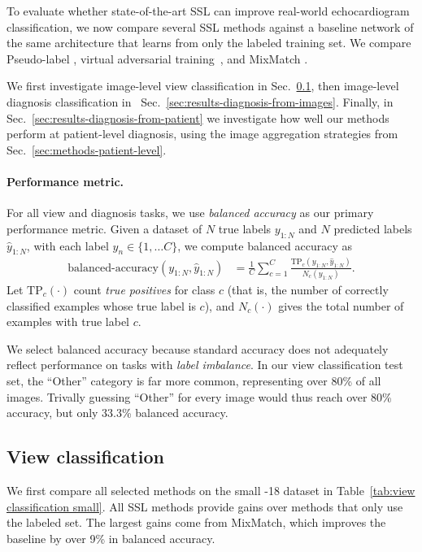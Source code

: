 To evaluate whether state-of-the-art SSL can improve real-world echocardiogram classification, we now compare several SSL methods against a baseline network of the same architecture that learns from only the labeled training set.
We compare Pseudo-label \citep{leePseudolabelSimpleEfficient2013}, virtual adversarial training~\citep{miyatoVirtualAdversarialTraining2019}, and MixMatch \citep{berthelotMixmatchHolisticApproach2019}. 

We first investigate image-level view classification in Sec.~\ref{sec:results-view}, then image-level diagnosis classification in ~Sec.~\ref{sec:results-diagnosis-from-images}.
Finally, in Sec.~\ref{sec:results-diagnosis-from-patient} we investigate how well our methods perform at patient-level diagnosis, using the image aggregation strategies from Sec.~\ref{sec:methods-patient-level}.

\paragraph{Performance metric.} For all view and diagnosis tasks, we use \emph{balanced accuracy} as our primary performance metric.
Given a dataset of $N$ true labels $y_{1:N}$ and $N$ predicted labels $\hat{y}_{1:N}$, with each label $y_n \in \{1, \ldots C\}$, we compute balanced accuracy as
\begin{align}
\text{balanced-accuracy}(y_{1:N}, \hat{y}_{1:N}) &= \frac{1}{C} \sum_{c=1}^{C} \frac{\text{TP}_{c}(y_{1:N}, \hat{y}_{1:N})}{N_{c}(y_{1:N})}.
\label{eq:balanced_accuracy}
\end{align}
Let $\text{TP}_c(\cdot)$ count \emph{true positives} for class $c$ (that is, the number of correctly classified examples whose true label is $c$), and $N_c(\cdot)$ gives the total number of examples with true label $c$.

We select balanced accuracy because standard accuracy does not adequately reflect performance on tasks with \emph{label imbalance}. In our view classification test set, the ``Other'' category is far more common, representing over 80\% of all images. Trivally guessing ``Other'' for every image would thus reach over 80\% accuracy, but only 33.3\% balanced accuracy.

\subsection{View classification}
\label{sec:results-view}

We first compare all selected methods on the small -18 dataset in Table~\ref{tab:view classification small}.
All SSL methods provide gains over methods that only use the labeled set. The largest gains come from MixMatch, which improves the baseline by over 9\% in balanced accuracy.

